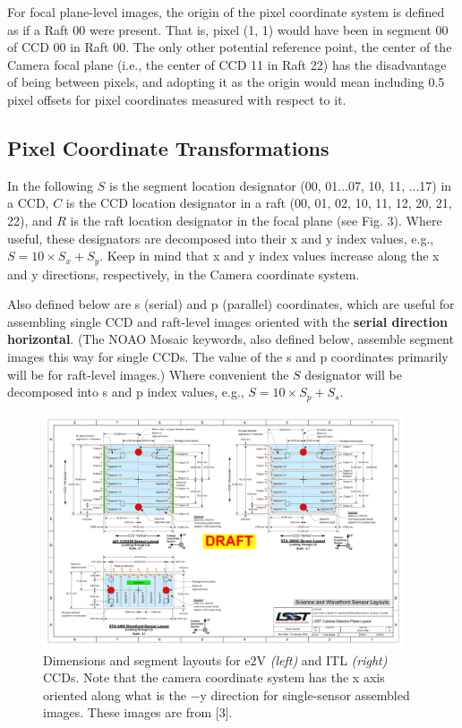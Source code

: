 \documentclass{article}[12pt]
\begin{document}
{For focal plane-level images, the origin of the pixel coordinate system is defined as if a Raft 00 were present.  That is, pixel (1, 1) would have been in segment 00 of CCD 00 in Raft 00.  The only other potential reference point, the center of the Camera focal plane (i.e., the center of CCD 11 in Raft 22) has the disadvantage of being between pixels, and adopting it as the origin would mean including 0.5 pixel offsets for pixel coordinates measured with respect to it.

\subsection{Pixel Coordinate Transformations}
In the following $S$ is the segment location designator (00, 01...07, 10, 11, ...17) in a CCD, $C$ is the CCD location designator in a raft (00, 01, 02, 10, 11, 12, 20, 21, 22), and $R$ is the raft location designator in the focal plane (see Fig. 3).  Where useful, these designators are decomposed into their x and y index values, e.g., $S = 10 \times S_x + S_y$.  Keep in mind that x and y index values increase along the x and y directions, respectively, in the Camera coordinate system.

Also defined below are s (serial) and p (parallel) coordinates, which are useful for assembling single CCD and raft-level images oriented with the {\bf serial direction horizontal}.  (The NOAO Mosaic keywords, also defined below, assemble segment images this way for single CCDs.  The value of the s and p coordinates primarily will be for raft-level images.)  Where convenient the $S$ designator will be decomposed into s and p index values, e.g., $S = 10 \times S_p + S_s$.

\begin{figure}
\centering
    \includegraphics[width=0.95\textwidth]{sensor_layout.pdf}
    \caption{Dimensions and segment layouts for e2V {\it (left)} and ITL {\it (right)} CCDs.  Note that the camera coordinate system has the x axis oriented along what is the $-$y direction for single-sensor assembled images.  These images are from [3].}
    \label{fig:sensor}
\end{figure}

}
\end{document}
